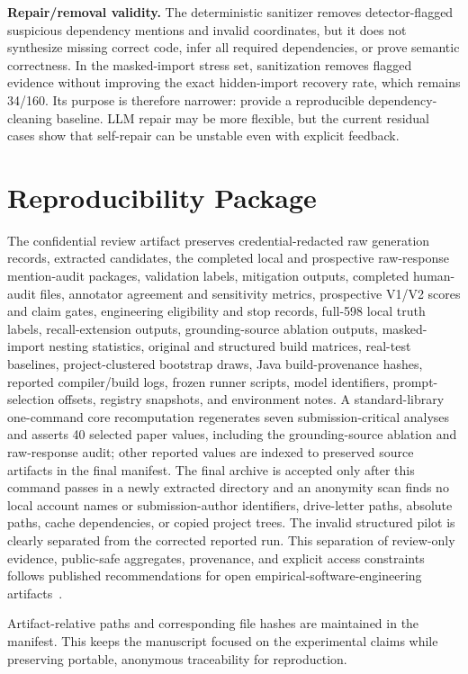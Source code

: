 \documentclass[pdflatex,sn-basic]{sn-jnl}
\begin{document}
\textbf{Repair/removal validity.} The deterministic sanitizer removes detector-flagged suspicious dependency mentions and invalid coordinates, but it does not synthesize missing correct code, infer all required dependencies, or prove semantic correctness. In the masked-import stress set, sanitization removes flagged evidence without improving the exact hidden-import recovery rate, which remains 34/160. Its purpose is therefore narrower: provide a reproducible dependency-cleaning baseline. LLM repair may be more flexible, but the current residual cases show that self-repair can be unstable even with explicit feedback.

\section{Reproducibility Package}

The confidential review artifact preserves credential-redacted raw generation records, extracted candidates, the completed local and prospective raw-response mention-audit packages, validation labels, mitigation outputs, completed human-audit files, annotator agreement and sensitivity metrics, prospective V1/V2 scores and claim gates, engineering eligibility and stop records, full-598 local truth labels, recall-extension outputs, grounding-source ablation outputs, masked-import nesting statistics, original and structured build matrices, real-test baselines, project-clustered bootstrap draws, Java build-provenance hashes, reported compiler/build logs, frozen runner scripts, model identifiers, prompt-selection offsets, registry snapshots, and environment notes. A standard-library one-command core recomputation regenerates seven submission-critical analyses and asserts 40 selected paper values, including the grounding-source ablation and raw-response audit; other reported values are indexed to preserved source artifacts in the final manifest. The final archive is accepted only after this command passes in a newly extracted directory and an anonymity scan finds no local account names or submission-author identifiers, drive-letter paths, absolute paths, cache dependencies, or copied project trees. The invalid structured pilot is clearly separated from the corrected reported run. This separation of review-only evidence, public-safe aggregates, provenance, and explicit access constraints follows published recommendations for open empirical-software-engineering artifacts~\citep{Runeson2024OpenArtifacts}.

Artifact-relative paths and corresponding file hashes are maintained in the manifest. This keeps the manuscript focused on the experimental claims while preserving portable, anonymous traceability for reproduction.
\end{document}
